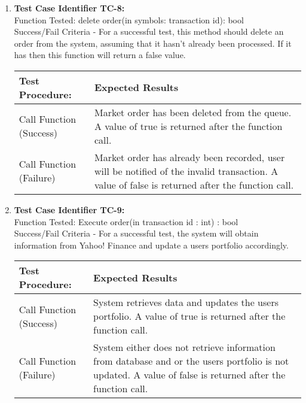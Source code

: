 \begin{enumerate}
  \item
    \textbf{Test Case Identifier TC-8:}\\

    Function Tested: delete order(in symbols: transaction id): bool\\

    Success/Fail Criteria - For a successful test, this method should delete an
    order from the system, assuming that it hasn’t already been processed. If it
    has then this function will return a false value.\\

    \begin{longtable}{|p{2in}|p{4.5in}|}
    \hline
    {\large \color{color1}Test Procedure:}&{\large \color{color1}Expected Results}\\ \hline
    Call Function (Success) & Market order has been deleted from the queue. A
    value of true is returned after the function call. \\ \hline
    Call Function (Failure) & Market order has already been recorded, user will
    be notified of the invalid transaction. A value of false is returned after
    the function call. \\ \hline
    \end{longtable}
    \vspace{5mm}


  \item
    \textbf{Test Case Identifier TC-9:}\\

    Function Tested: Execute order(in transaction id : int) : bool \\

    Success/Fail Criteria - For a successful test, the system will obtain
    information from Yahoo! Finance and update a users portfolio accordingly.\\

    \begin{longtable}{|p{2in}|p{4.5in}|}
    \hline
    {\large \color{color1}Test Procedure:}&{\large \color{color1}Expected Results}\\ \hline
    Call Function (Success) & System retrieves data and updates the users
    portfolio. A value of true is returned after the function call.\\ \hline
    Call Function (Failure) & System either does not retrieve information from
    database and or the users portfolio is not updated. A value of false is
    returned after the function call. \\ \hline
    \end{longtable}
    \vspace{5mm}
  
    \end{enumerate}

